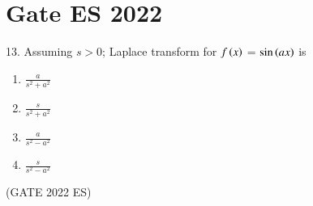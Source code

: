 \documentclass[journal,12pt,twocolumn]{IEEEtran}
\begin{document}


\vspace{3cm}

\title{}
\author{EE23BTECH11054 -  Sai Krishna Shanigarapu$^{*}$
}
\maketitle
\newpage
\bigskip


\section*{Gate ES 2022}
13. \hspace{2pt}Assuming $s>0$; Laplace transform for $f\left(x\right)$ = $\sin\left(ax\right)$ is\\
\begin{enumerate}[label=(\Alph*)]
    \item $\frac{a}{s^2+a^2}$\\
    \item $\frac{s}{s^2 + a^2}$\\
    \item $\frac{a}{s^2-a^2}$\\
    \item $\frac{s}{s^2-a^2}$
\end{enumerate}
\hfill(GATE 2022 ES)
\end{document}

